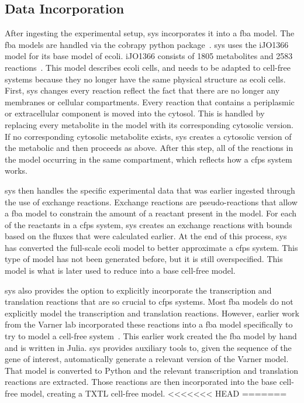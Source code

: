\subsection{Data Incorporation} \label{sec:incorp}
After ingesting the experimental setup, \gls{sys} incorporates it into a \gls{fba} model.
The \gls{fba} models are handled via the \gls{cobra}py python package~\cite{ebrahim2013cobrapy}.
\gls{sys} uses the iJO1366 model for its base model of \gls{ecoli}.
iJO1366 consists of 1805 metabolites and 2583 reactions~\cite{orth2011comprehensive}.
This model describes \gls{ecoli} cells, and needs to be adapted to cell-free systems because they no longer have the same physical structure as \gls{ecoli} cells.
First, \gls{sys} changes every reaction reflect the fact that there are no longer any membranes or cellular compartments.
Every reaction that contains a periplasmic or extracellular component is moved into the cytosol.
This is handled by replacing every metabolite in the model with its corresponding cytosolic version.
If no corresponding cytosolic metabolite exists, \gls{sys} creates a cytosolic version of the metabolic and then proceeds as above.
After this step, all of the reactions in the model occurring in the same compartment, which reflects how a \gls{cfps} system works.

\gls{sys} then handles the specific experimental data that was earlier ingested through the use of exchange reactions.
Exchange reactions are pseudo-reactions that allow a \gls{fba} model to constrain the amount of a reactant present in the model.
For each of the reactants in a \gls{cfps} system, \gls{sys} creates an exchange reactions with bounds based on the fluxes that were calculated earlier.
At the end of this process, \gls{sys} has converted the full-scale \gls{ecoli} model to better approximate a \gls{cfps} system.
This type of model has not been generated before, but it is still overspecified.
This model is what is later used to reduce into a base cell-free model.

\gls{sys} also provides the option to explicitly incorporate the transcription and translation reactions that are so crucial to \gls{cfps} systems.
Most \gls{fba} models do not explicitly model the transcription and translation reactions.
However, earlier work from the Varner lab incorporated these reactions into a \gls{fba} model specifically to try to model a cell-free system~\cite{vilkhovoy2017sequence}.
This earlier work created the \gls{fba} model by hand and is written in Julia.
\gls{sys} provides auxiliary tools to, given the sequence of the gene of interest, automatically generate a relevant version of the Varner model.
That model is converted to Python and the relevant transcription and translation reactions are extracted.
Those reactions are then incorporated into the base cell-free model, creating a TXTL cell-free model.
<<<<<<< HEAD
=======

